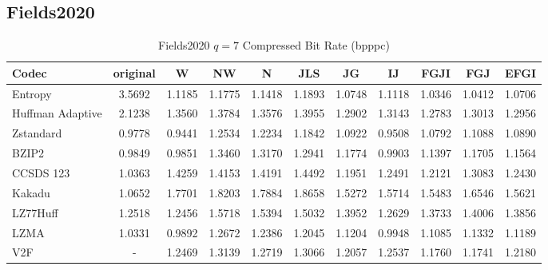 \documentclass{article}
\begin{document}
\subsection{Fields2020}
\begin{table}[h!]
\centering
\caption{Fields2020 $q=7$ Compressed Bit Rate (bpppc)}
\begin{tabular}{|l|cccccccccc|}
\hline
Codec &  original &      W &     NW &      N &    JLS &     JG &     IJ &   FGJI &    FGJ &   EFGI \\
\hline
Entropy & 3.5692 & 1.1185 & 1.1775 & 1.1418 & 1.1893 & 1.0748 & 1.1118 & 1.0346 & 1.0412 & 1.0706 \\
\hline
Huffman Adaptive &    2.1238 & 1.3560 & 1.3784 & 1.3576 & 1.3955 & 1.2902 & 1.3143 & 1.2783 & 1.3013 & 1.2956 \\
Zstandard        &    0.9778 & 0.9441 & 1.2534 & 1.2234 & 1.1842 & 1.0922 & 0.9508 & 1.0792 & 1.1088 & 1.0890 \\
BZIP2            &    0.9849 & 0.9851 & 1.3460 & 1.3170 & 1.2941 & 1.1774 & 0.9903 & 1.1397 & 1.1705 & 1.1564 \\
CCSDS 123        &    1.0363 & 1.4259 & 1.4153 & 1.4191 & 1.4492 & 1.1951 & 1.2491 & 1.2121 & 1.3083 & 1.2430 \\
Kakadu           &    1.0652 & 1.7701 & 1.8203 & 1.7884 & 1.8658 & 1.5272 & 1.5714 & 1.5483 & 1.6546 & 1.5621 \\
LZ77Huff         &    1.2518 & 1.2456 & 1.5718 & 1.5394 & 1.5032 & 1.3952 & 1.2629 & 1.3733 & 1.4006 & 1.3856 \\
LZMA             &    1.0331 & 0.9892 & 1.2672 & 1.2386 & 1.2045 & 1.1204 & 0.9948 & 1.1085 & 1.1332 & 1.1189 \\
V2F              &   - & 1.2469 & 1.3139 & 1.2719 & 1.3066 & 1.2057 & 1.2537 & 1.1760 & 1.1741 & 1.2180 \\
\hline
\end{tabular}
\end{table}
\end{document}
